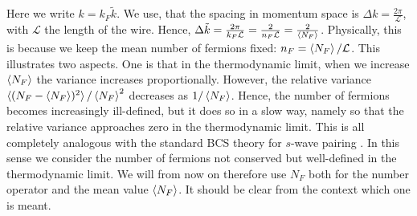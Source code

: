 Here we write $k = k_F \tilde{k}$. We use, that the spacing in momentum space is $\Delta k = \frac{2\pi}{\mathcal{L}}$, with $\mathcal{L}$ the length of the wire. Hence, $\Delta \tilde{k} = \frac{2\pi}{k_F\mathcal{L}} = \frac{2}{n_F\mathcal{L}} = \frac{2}{\braket{N_F}}$. Physically, this is because we keep the mean number of fermions fixed: $n_F = \braket{N_F}/\mathcal{L}$. This illustrates two aspects. One is that in the thermodynamic limit, when we increase $\braket{N_F}$ the variance increases proportionally. However, the relative variance $\braket{(N_F-\braket{N_F})^2}/\braket{N_F}^2$ decreases as $1/\braket{N_F}$. Hence, the number of fermions becomes increasingly ill-defined, but it does so in a slow way, namely so that the relative variance approaches zero in the thermodynamic limit. This is all completely analogous with the standard BCS theory for $s$-wave pairing \cite[pp. 50-52]{Tinkham}. In this sense we consider the number of fermions not conserved but well-defined in the thermodynamic limit. We will from now on therefore use $N_F$ both for the number operator and the mean value $\braket{N_F}$. It should be clear from the context which one is meant.   

